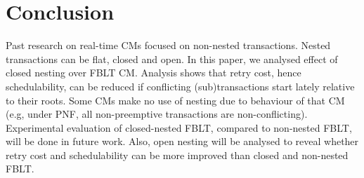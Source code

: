 \documentclass[10pt, conference, compsocconf]{IEEEtran}
\begin{document}
\section{Conclusion}\label{sec:conclusion}

Past research on real-time CMs focused on non-nested transactions. Nested transactions can be flat, closed and open. In this paper, we analysed effect of closed nesting over FBLT CM. Analysis shows that retry cost, hence schedulability, can be reduced if conflicting (sub)transactions start lately relative to their roots. Some CMs make no use of nesting due to behaviour of that CM (e.g, under PNF, all non-preemptive transactions are non-conflicting). Experimental evaluation of closed-nested FBLT, compared to non-nested FBLT, will be done in future work. Also, open nesting will be analysed to reveal whether retry cost and schedulability can be more improved than closed and non-nested FBLT. 

%

\end{document}
